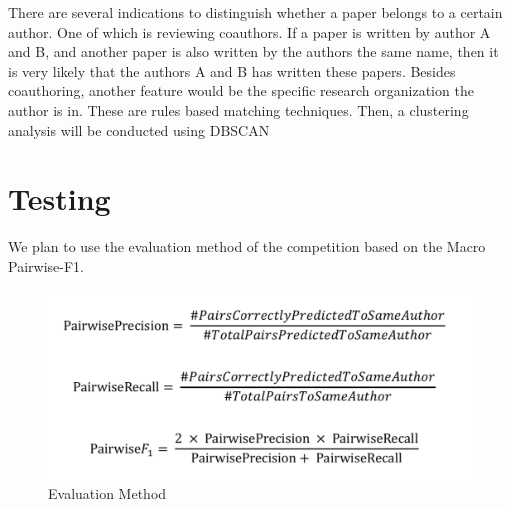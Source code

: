 \documentclass{article}
\begin{document}
There are several indications to distinguish whether a paper belongs to a certain author. 
One of which is reviewing coauthors. If a paper is written by author A and B, and another 
paper is also written by the authors the same name, then it is very likely that the authors
 A and B has written these papers. Besides coauthoring, another feature would be the specific 
 research organization the author is in. These are rules based matching techniques. Then, 
 a clustering analysis will be conducted using DBSCAN


\section{Testing}

We plan to use the evaluation method of the competition based on the Macro Pairwise-F1.

\begin{figure}
     \centering
     \includegraphics[scale=0.5]{31568965826.png}
     \caption{Evaluation Method}
\end{figure}
\end{document}
